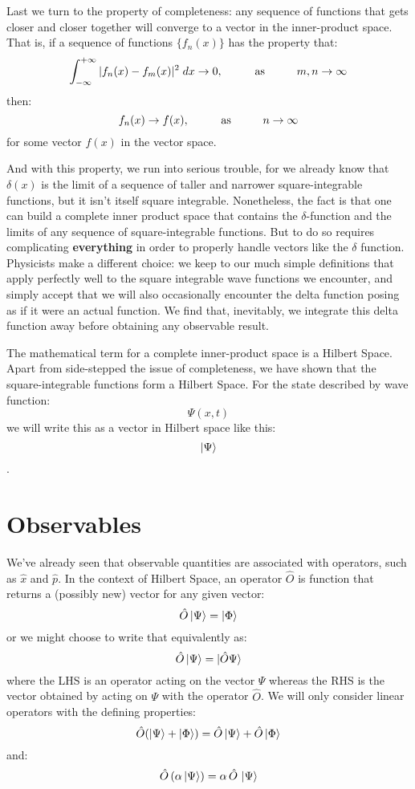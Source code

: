 \documentclass[12pt]{book}
\begin{document}
Last we turn to the property of completeness:  any sequence of functions that gets closer and closer together will converge to a vector in the inner-product space.
That is, if a sequence of functions $\{f_n(x)\}$ has the property that:
$$\int_{-\infty}^{+\infty} |f_n(x) - f_m(x)|^2 \; dx \to 0, \hspace{1cm} {\rm as} \hspace{1cm} m,n \to \infty$$
then:
$$f_n(x) \to f(x), \hspace{1cm} {\rm as} \hspace{1cm} n \to \infty$$
for some vector $f(x)$ in the vector space.

And with this property, we run into serious trouble, for we already know that $\delta(x)$ is the limit of a sequence of taller and narrower square-integrable functions, but it isn't itself square integrable.  Nonetheless, the fact is that one can build a complete inner product space that contains the $\delta$-function and the limits of any sequence of square-integrable functions.  But to do so requires complicating {\bf everything} in order to properly handle vectors like the $\delta$ function.  Physicists make a different choice: we keep to our much simple definitions that apply perfectly well to the square integrable wave functions we encounter, and simply accept that we will also occasionally encounter the delta function posing as if it were an actual function.  We find that, inevitably, we integrate this delta function away before obtaining any observable result.

The mathematical term for a complete inner-product space is a Hilbert Space.  Apart from side-stepped the issue of completeness, we have shown that the square-integrable functions form a Hilbert Space.  
For the state described by wave function:
$$\Psi(x,t)$$
we will write this as a vector in Hilbert space like this:
$$\ket{\Psi}$$.

\section{Observables}

We've already seen that observable quantities are associated with operators, such as $\hat{x}$ and $\hat{p}$.  In the context of Hilbert Space, an operator $\hat{O}$ is function that returns a (possibly new) vector for any given vector:
$$\hat{O}\ket{\Psi} = \ket{\Phi}$$ 
or we might choose to write that equivalently as:
$$\hat{O}\ket{\Psi} = \ket{\hat{O} \Psi}$$ 
where the LHS is an operator acting on the vector $\Psi$ whereas the RHS is the vector obtained by acting on $\Psi$ with the operator $\hat{O}$.  We will only consider linear operators with the defining properties:
$$\hat{O}(\ket{\Psi}+\ket{\Phi}) = \hat{O}\ket{\Psi}+\hat{O}\ket{\Phi}$$
and:
$$\hat{O}\,(\alpha\ket{\Psi}) = \alpha \,\hat{O}\,\ket{\Psi}$$
\end{document}
